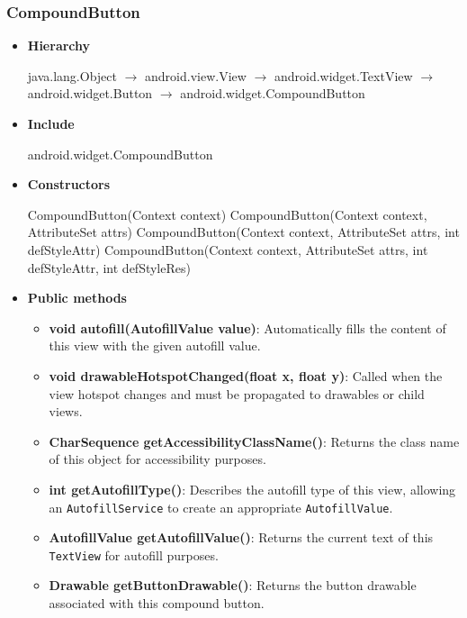 \documentclass{report}
\begin{document}
    \subsubsection{CompoundButton}
    \begin{itemize}
         \item \textbf{Hierarchy} 
            \begin{center}
                java.lang.Object $\to$	android.view.View $\to$	android.widget.TextView $\to$	android.widget.Button $\to$	android.widget.CompoundButton
            \end{center}
        \item \textbf{Include}
            \bigbreak \noindent 
            \begin{javacode}
                android.widget.CompoundButton
            \end{javacode}
        \item \textbf{Constructors}
            \bigbreak \noindent 
            \begin{javacode}
                CompoundButton(Context context)
                CompoundButton(Context context, AttributeSet attrs)
                CompoundButton(Context context, AttributeSet attrs, int defStyleAttr)
                CompoundButton(Context context, AttributeSet attrs, int defStyleAttr, int defStyleRes)
            \end{javacode}
        \item \textbf{Public methods}
            \begin{itemize}
                \item \textbf{void autofill(AutofillValue value)}: Automatically fills the content of this view with the given autofill value.
                \item \textbf{void drawableHotspotChanged(float x, float y)}: Called when the view hotspot changes and must be propagated to drawables or child views.
                \item \textbf{CharSequence getAccessibilityClassName()}: Returns the class name of this object for accessibility purposes.
                \item \textbf{int getAutofillType()}: Describes the autofill type of this view, allowing an \texttt{AutofillService} to create an appropriate \texttt{AutofillValue}.
                \item \textbf{AutofillValue getAutofillValue()}: Returns the current text of this \texttt{TextView} for autofill purposes.
                \item \textbf{Drawable getButtonDrawable()}: Returns the button drawable associated with this compound button.

\end{itemize}
\end{itemize}
\end{document}
